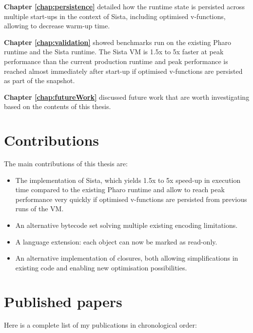 \documentclass[a4paper,12pt,twoside]{../includes/ThesisStyle}
\begin{document}
\textbf{Chapter \ref{chap:persistence}} detailed how the runtime state is persisted across multiple start-ups in the context of Sista, including optimised v-functions, allowing to decrease warm-up time. 

\textbf{Chapter \ref{chap:validation}} showed benchmarks run on the existing Pharo runtime and the Sista runtime. The Sista VM is 1.5x to 5x faster at peak performance than the current production runtime and peak performance is reached almost immediately after start-up if optimised v-functions are persisted as part of the snapshot.

\textbf{Chapter \ref{chap:futureWork}} discussed future work that are worth investigating based on the contents of this thesis.

\section{Contributions}

The main contributions of this thesis are:
\begin{itemize}
	\item The implementation of Sista, which yields 1.5x to 5x speed-up in execution time compared to the existing Pharo runtime and allow to reach peak performance very quickly if optimised v-functions are persisted from previous runs of the VM.
	\item An alternative bytecode set solving multiple existing encoding limitations.
	\item A language extension: each object can now be marked as read-only.
	\item An alternative implementation of closures, both allowing simplifications in existing code and enabling new optimisation possibilities.
\end{itemize}

\section{Published papers}

Here is a complete list of my publications in chronological order:
\end{document}
